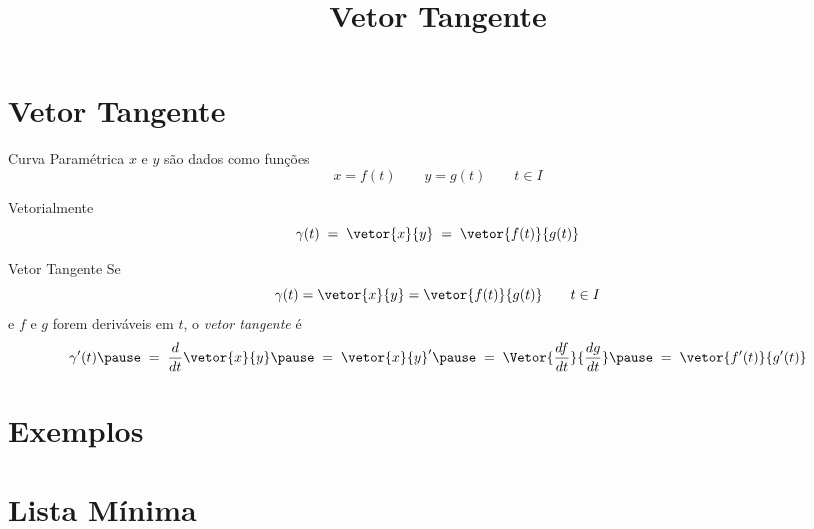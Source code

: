 \documentclass[fleqn,utf8,aspectratio=169,12pt]{beamer}
\title{Vetor Tangente}
\begin{document}
\addtitle

\section{Vetor Tangente}

\begin{frame}{Curva Paramétrica}
  $x$ e $y$ são dados como funções
  \[
    x = f(t)     \qquad
    y = g(t)     \qquad
    t \in I
  \]

  \pause
  Vetorialmente
  \[
    \gamma(t)
    \;=\; \vetor{x}{y}
    \;=\; \vetor{f(t)}{g(t)}
  \]
\end{frame}


\begin{frame}{Vetor Tangente}
  Se
  \[
    \gamma(t)
    = \vetor{x}{y}
    = \vetor{f(t)}{g(t)}
    \qquad
    t \in I
  \]
  \pause
  e $f$ e $g$ forem deriváveis em $t$,
  \pause
  o \emph{vetor tangente} é
  \pause
  \[
    \gamma'(t)
    \pause
    \;=\; \frac{d}{dt} \vetor{x}{y}
    \pause
    \;=\; \vetor{x}{y}'
    \pause
    \;=\; \Vetor{\dfrac{df}{dt}}{\dfrac{dg}{dt}}
    \pause
    \;=\; \vetor{f'(t)}{g'(t)}
  \]
\end{frame}

\section{Exemplos}







\section{Lista Mínima}
\end{document}
